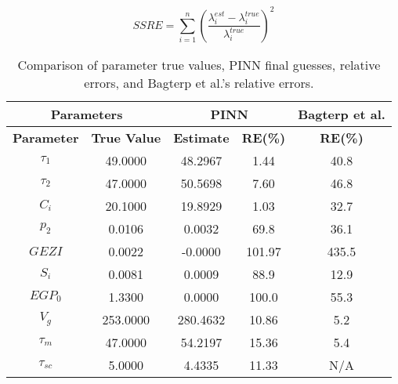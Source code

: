 \documentclass[11pt]{memoir}
\begin{document}
	 \[ SSRE = \sum_{i=1}^{n}\left(\frac{\lambda^{est}_i - \lambda_i^{true} }{\lambda_i^{true}}\right)^2 \]
	 
	 
	 \begin{table}[h!]
	 	\centering
	 	\begin{tabular}{|c|c|c|c|c|}
	 		\hline
	 		\multicolumn{2}{|c|}{\textbf{Parameters}} & \multicolumn{2}{c|}{\textbf{PINN}} & \textbf{Bagterp et al. } \\ \hline
	 		\textbf{Parameter} & \textbf{True Value} & \textbf{Estimate} & \textbf{RE(\%)} & \textbf{RE(\%)} \\ \hline
	 		 $\tau_1$     &  49.0000   &  48.2967    &  1.44     & 40.8     \\ \hline
	 		 $\tau_2$   &  47.0000  &  50.5698 &  7.60   & 46.8     \\ \hline
	 		 $C_i$      &  20.1000  &  19.8929  &   1.03   & 32.7     \\ \hline
	 		 $p_2$      &  0.0106  &  0.0032  &   69.8   & 36.1     \\ \hline
	 		 $GEZI$     &   0.0022  &  -0.0000   &   101.97   &  435.5   \\ \hline
	 		$S_i$       &  0.0081   &  0.0009   &  88.9   &  12.9    \\ \hline
	 		$EGP_0$     & 1.3300    & 0.0000    & 100.0    & 55.3     \\ \hline
	 		$V_g$       & 253.0000  & 280.4632  & 10.86    & 5.2      \\ \hline
	 		$\tau_m$    & 47.0000   & 54.2197   & 15.36    & 5.4      \\ \hline
	 		$\tau_{sc}$  & 5.0000    & 4.4335    & 11.33    & N/A        \\ \hline
	 	\end{tabular}
	 	\caption{Comparison of parameter true values, PINN final guesses, relative errors, and Bagterp et al.'s relative errors.}
	 	\label{tab:parameter_compariso3n}
	 \end{table}
	 
\end{document}
